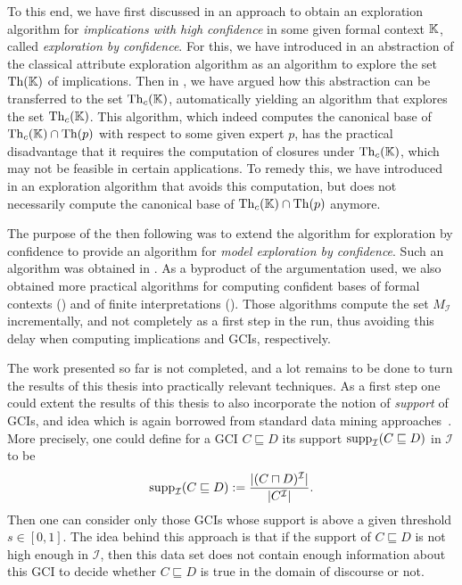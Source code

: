 To this end, we have first discussed in  an approach to obtain an
exploration algorithm for \emph{implications with high confidence} in some given formal
context ${\mathbb{K}}$, called \emph{exploration by confidence}.  For this, we have introduced
in  an abstraction of the classical attribute exploration
algorithm as an algorithm to explore the set $\operatorname{Th}({\mathbb{K}})$ of implications.  Then in
, we have argued how this abstraction can be transferred to the set
$\operatorname{Th}_{c}({\mathbb{K}})$, automatically yielding an algorithm that explores the set $\operatorname{Th}_{c}({\mathbb{K}})$.  This algorithm, which indeed computes the canonical base of $\operatorname{Th}_{c}({\mathbb{K}}) \cap
\operatorname{Th}(p)$ with respect to some given expert $p$, has the practical disadvantage that it
requires the computation of closures under $\operatorname{Th}_{c}({\mathbb{K}})$, which may not be feasible in
certain applications.  To remedy this, we have introduced in  an
exploration algorithm that avoids this computation, but does not necessarily compute the
canonical base of $\operatorname{Th}_{c}({\mathbb{K}}) \cap \operatorname{Th}(p)$ anymore.

The purpose of the then following  was to extend the algorithm
for exploration by confidence to provide an algorithm for \emph{model exploration by
  confidence}.  Such an algorithm was obtained in .  As a
byproduct of the argumentation used, we also obtained more practical algorithms for
computing confident bases of formal contexts () and of finite
interpretations ().  Those algorithms compute the set
$M_{\mathcal{I}}$ incrementally, and not completely as a first step in the run, thus
avoiding this delay when computing implications and GCIs, respectively.

The work presented so far is not completed, and a lot remains to be done to turn the
results of this thesis into practically relevant techniques.  As a first step one could
extent the results of this thesis to also incorporate the notion of \emph{support} of
GCIs, and idea which is again borrowed from standard data mining
approaches~\cite{arules:agrawal:association-rules}.  More precisely, one could define for
a GCI $C \sqsubseteq D$ its support $\operatorname{supp}_{\mathcal{I}}(C \sqsubseteq D)$ in
$\mathcal{I}$ to be
\begin{equation*}
  \operatorname{supp}_{\mathcal{I}}( C \sqsubseteq D ) := \frac{ \lvert(C \sqcap D)^{\mathcal{I}}\rvert }{
    \lvert C^{\mathcal{I}} \rvert }.
\end{equation*}
Then one can consider only those GCIs whose support is above a given threshold $s \in
[0,1]$.  The idea behind this approach is that if the support of $C \sqsubseteq D$ is not
high enough in $\mathcal{I}$, then this data set does not contain enough information about
this GCI to decide whether $C \sqsubseteq D$ is true in the domain of discourse or not.

